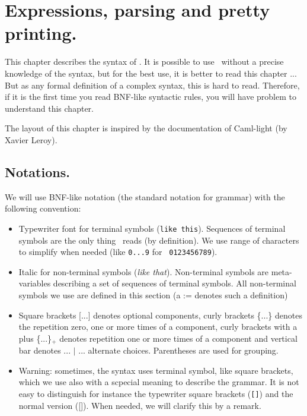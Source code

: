 
\chapter{Expressions, parsing and pretty printing.}\label{parser}

This chapter describes the syntax of \AFD. It is possible to use \AFD\
without a precise knowledge of the syntax, but for the best use, it is
better to read this chapter ... But as any formal definition of a
complex syntax, this is hard to read. Therefore, if it is the first time you
read BNF-like syntactic rules, you will have problem to understand this
chapter.

The layout of this chapter is inspired by the documentation of Caml-light (by
Xavier Leroy).

\section{Notations.}

We will use BNF-like notation (the standard notation for
grammar) with the following convention:
\begin{itemize}
\item Typewriter font for terminal symbols ({\tt like this}). Sequences of
  terminal symbols are the only thing \AFD\ reads (by definition). We use range
  of characters to simplify when needed (like {\tt 0...9} for {\tt
  0123456789}).
\item Italic for non-terminal symbols ({\it like that}). Non-terminal
  symbols are meta-variables describing a set of sequences of terminal
  symbols. All non-terminal symbols we use are defined in this section (a
  := denotes such a definition)
\item Square brackets [...] denotes optional components, curly brackets
  \{...\} denotes the repetition zero, one or more times of a component, curly
  brackets with a plus \{...\}$_+$ denotes repetition one or more times of a
  component and vertical bar denotes ... $|$ ... alternate choices.
  Parentheses are used for grouping.
\item Warning: sometimes, the syntax uses terminal symbol, like square
brackets, which we use also with a scpecial meaning to describe the
grammar. It is not easy to distinguish for instance the typewriter
square brackets ({\tt []}) and the normal version ({[]}). When needed,
we will clarify this by a remark.
\end{itemize}

